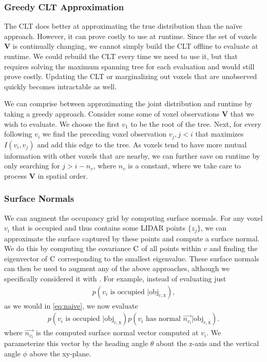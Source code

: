 \subsubsection{Greedy CLT Approximation} \label{sec:greedy_clt}

The \ac{CLT} does better at approximating the true distribution than the na\"ive
approach. However, it can prove costly to use at runtime. Since the set of
voxels $\mathbf{V}$ is continually changing, we cannot simply build the \ac{CLT}
offline to evaluate at runtime. We could rebuild the \ac{CLT} every time we need
to use it, but that requires solving the maximum spanning tree for each
evaluation and would still prove costly. Updating the \ac{CLT} or marginalizing
out voxels that are unobserved quickly becomes intractable as well.

We can comprise between approximating the joint distribution and runtime by
taking a greedy approach. Consider some some of voxel observations $\mathbf{V}$
that we wish to evaluate. We choose the first $v_1$ to be the root of the tree.
Next, for every following $v_i$ we find the preceding voxel observation $v_j, j
< i$ that maximizes $I(v_i, v_j)$ and add this edge to the tree. As voxels tend
to have more mutual information with other voxels that are nearby, we can
further save on runtime by only searching for $j > i - n_v$, where $n_v$ is a
constant, where we take care to process $\mathbf{V}$ in spatial order.

\subsubsection{Surface Normals} \label{sec:normals}

We can augment the occupancy grid by computing surface normals. For any voxel
$v_i$ that is occupied and thus contains some \ac{LIDAR} points $\{z_j\}$, we
can approximate the surface captured by these points and compute a surface
normal. We do this by computing the covariance $\mathrm{C}$ of all points within
$v$ and finding the eigenvector of $\mathrm{C}$ corresponding to the smallest
eigenvalue. These surface normals can then be used to augment
any of the above approaches, although we specifically considered it with
. For example, instead of evaluating just
%
\begin{align}
  p(v_i \text{ is occupied } | \mathrm{obj_{c,x}}) \text{,}
\end{align}
%
as we would in \eqref{eq:naive}, we now evaluate
%
\begin{align}
  p(v_i \text{ is occupied } | \mathrm{obj_{c,x}}) p(v_i \text{ has normal }
  \vec{n_{v_i}}
  | \mathrm{obj_{c, x}}) \text{.}
\end{align}
%
where $\vec{n_{v_i}}$ is the computed surface normal vector computed at $v_i$.
We parameterize this vector by the heading angle $\theta$ about the z-axis and
the vertical angle $\phi$ above the xy-plane.

